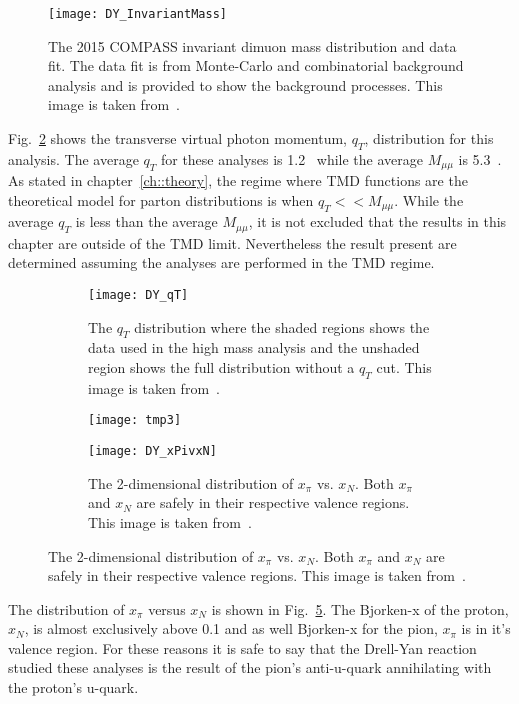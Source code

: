 \begin{figure}[h!t]
  \centering \texttt{[image: DY\_InvariantMass]}
  \caption{The 2015 COMPASS invariant dimuon mass distribution and data fit.
    The data fit is from Monte-Carlo and combinatorial background analysis and
    is provided to show the background processes.  This image is taken
    from~\cite{compassDYpaper}.}
  \label{fig::DY_InvariantMass}
\end{figure}

Fig.~\ref{fig::DY_qT} shows the transverse virtual photon momentum, $q_T$,
distribution for this analysis.  The average $q_T$ for these analyses is
1.2~{\gvc} while the average $M_{\mu\mu}$ is 5.3~{\gvcw}.  As stated in
chapter~\ref{ch::theory}, the regime where TMD functions are the theoretical
model for parton distributions is when $q_T << M_{\mu\mu}$.  While the average
$q_T$ is less than the average $M_{\mu\mu}$, it is not excluded that the results
in this chapter are outside of the TMD limit.  Nevertheless the result present
are determined assuming the analyses are performed in the TMD regime.

\begin{figure}[h!t]
  \centering
  \begin{subfigure}{0.45\textwidth}
    \centering \texttt{[image: DY\_qT]}
    \caption{The $q_T$ distribution where the shaded regions shows the data used
      in the high mass analysis and the unshaded region shows the full
      distribution without a $q_T$ cut.  This image is taken
      from~\cite{compassDYpaper}.}
    \label{fig::DY_qT}
  \end{subfigure}
  \begin{subfigure}{.02\textwidth}
    \texttt{[image: tmp3]}
    \label{fig::tmp2}%
  \end{subfigure}
    \begin{subfigure}{0.48\textwidth}
    \centering \texttt{[image: DY\_xPivxN]}
    \caption{The 2-dimensional distribution of $x_{\pi}$ vs. $x_{N}$.  Both
      $x_{\pi}$ and $x_N$ are safely in their respective valence regions.  This
      image is taken from~\cite{compassDYpaper}.}
    \label{fig::DY_xPivxN}
  \end{subfigure}
\end{figure}

The distribution of $x_{\pi}$ versus $x_N$ is shown in
Fig.~\ref{fig::DY_xPivxN}.  The Bjorken-x of the proton, $x_N$, is almost
exclusively above 0.1 and as well Bjorken-x for the pion, $x_{\pi}$ is in it's
valence region.  For these reasons it is safe to say that the Drell-Yan reaction
studied these analyses is the result of the pion's anti-u-quark annihilating
with the proton's u-quark.

